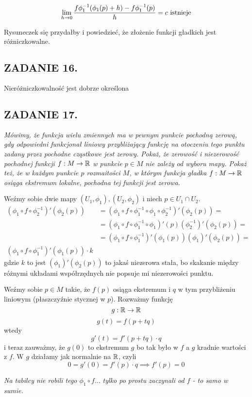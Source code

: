 $$\lim\limits_{h\to0}{f\phi_1^{-1}(\phi_1(p)+h)-f\phi_1^{-1}(p)\over h}=c\text{ istnieje}$$

Rysuneczek się przydałby i powiedzieć, że złożenie funkcji gładkich jest różniczkowalne.

\subsection*{ZADANIE 16.}
Nieróżniczkowalność jest dobrze określona

\subsection*{ZADANIE 17.}
\emph{\color{pink}Mówimy, że funkcja wielu zmiennych ma w pewnym punkcie pochodną zerową, gdy odpowiedni funkcjonał liniowy przybliżający funkcję na otoczeniu tego punktu zadany przez pochodne cząstkowe jest zerowy. Pokaż, że zerowość i niezerowość pochodnej funkcji $f:M\to\mathbb{R}$ w punkcie $p\in M$ nie zależy od wyboru mapy. Pokaż też, że w każdym punkcie $p$ rozmaitości $M$, w którym funkcja gładka $f:M\to\mathbb{R}$ osiąga ekstremum lokalne, pochodna tej funkcji jest zerowa.}
\smallskip

Weźmy sobie dwie mapy $(U_1,\phi_1),(U_2,\phi_2)$ i niech $p\in U_1\cap U_2$.
\begin{align*}
    (\phi_1\circ f\circ\phi_2^{-1})'(\phi_2(p))&=(\phi_1\circ f\circ\phi_1^{-1}\circ \phi_1\circ\phi_2^{-1})'(\phi_2(p))=\\
    &=(\phi_1\circ f\circ\phi_1^{-1}\circ\phi_1)'(p)(\phi_2^{-1})'(\phi_2(p))=\\
    &=(\phi_1\circ f\circ\phi_1^{-1})'(\phi_1(p))(\phi_1)'(\phi_2(p))=\\
    (\phi_1\circ f\circ\phi_1^{-1})'(\phi_1(p))\cdot k
\end{align*}
gdzie $k$ to jest $(\phi_1)'(\phi_2(p))$ to jakaś niezerowa stała, bo skakanie między różnymi układami współrzędnych nie popsuje mi niezerowości punktu.

Weźmy sobie $p\in M$ takie, że $f(p)$ osiąga ekstremum i $q$ w tym przybliżeniu liniowym (płaszczyźnie stycznej w $p$). Rozważmy funkcję
$$g:\mathbb{R}\to\mathbb{R}$$
$$g(t)=f(p+tq)$$
wtedy
$$g'(t)=f'(p+tq)\cdot q$$
i teraz zauważmy, że $g(0)$ to ekstremum $g$ bo tak było w $f$ a $g$ kradnie wartości z $f$. W $g$ działamy jak normalnie na $\mathbb{R}$, czyli
$$0=g'(0)=f'(p)\cdot q\implies f'(p)=0$$

\emph{Na tabilcy nie robili tego $\phi_1\circ f...$ tylko po prostu zaczynali od $f$ - to samo w sumie.}

